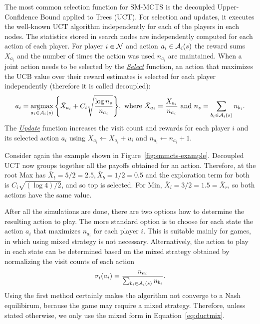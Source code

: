 The most common selection function for SM-MCTS is the decoupled Upper-Confidence Bound applied to Trees (UCT).
For selection and updates, it executes the well-known UCT \cite{UCT} algorithm independently for each of the players in each nodes.
The statistics stored in search nodes are independently computed for each action of each player. For player $i\in \mathcal{N}$ and
action $a_i \in \mathcal{A}_i(s)$ the reward sums $X_{a_i}$ and the number of times the action was used $n_{a_i}$ are maintained.
When a joint action needs to be selected by the \emph{\underline{Select}} function, an action that maximizes the UCB value over
their reward estimates is selected for each player independently (therefore it is called decoupled):
\begin{equation}
a_i = \argmax_{a_i \in \cA_i(s)}{ \left\{ \bar{X}_{a_i} + C_i \sqrt{\frac{\log n_s}{n_{a_i}}} \right\} },
  \mbox{ where } \bar{X}_{a_i} = \frac{X_{a_i}}{n_{a_i}} \mbox{ and } n_s=\sum_{b_i \in \cA_i(s)} n_{b_i}.\label{eq:uct}
\end{equation}
\noindent The \emph{\underline{Update}} function increases the visit count and rewards for each player $i$ and its selected action $a_i$ using $X_{a_i} \leftarrow X_{a_i} + u_i$
and $n_{a_i} \leftarrow n_{a_i} + 1$.

Consider again the example shown in Figure~\ref{fig:smmcts-example}. Decoupled UCT now groups together all the payoffs obtained
for an action. Therefore, at the root Max has $\bar{X}_t = 5/2 = 2.5, \bar{X}_b = 1/2 = 0.5$ and the exploration term for both is
$C_i \sqrt{(\log 4) / 2}$, and so top is selected. For Min, $\bar{X}_l = 3/2 = 1.5 = \bar{X}_r$, so both actions have the same value.

After all the simulations are done, there are two options how to determine the resulting action to play.
The more standard option is to choose for each state the action $a_i$ that maximizes $n_{a_i}$ for each player $i$.
This is suitable mainly for games, in which using mixed strategy is not necessary.
Alternatively, the action to play in each state can be determined based on the mixed strategy obtained by normalizing the visit counts of each action
\begin{equation}
\sigma_i(a_i) = \frac{n_{a_i}}{\sum_{b_i\in \mathcal{A}_i(s)} n_{b_i}}.
\label{eq:ductmix}
\end{equation}
Using the first method certainly makes the algorithm not converge to a Nash equilibirum, because the game may require a mixed strategy.
Therefore, unless stated otherwise, we only use the mixed form in Equation~\ref{eq:ductmix}.%

